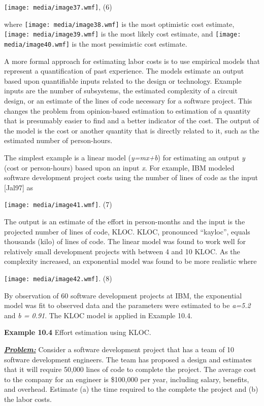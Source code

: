 \texttt{[image: media/image37.wmf]}, (6)

where \texttt{[image: media/image38.wmf]} is the most optimistic cost
estimate, \texttt{[image: media/image39.wmf]} is the most likely cost
estimate, and \texttt{[image: media/image40.wmf]} is the most
pessimistic cost estimate.

A more formal approach for estimating labor costs is to use empirical
models that represent a quantification of past experience. The models
estimate an output based upon quantifiable inputs related to the design
or technology. Example inputs are the number of subsystems, the
estimated complexity of a circuit design, or an estimate of the lines of
code necessary for a software project. This changes the problem from
opinion-based estimation to estimation of a quantity that is presumably
easier to find and a better indicator of the cost. The output of the
model is the cost or another quantity that is directly related to it,
such as the estimated number of person-hours.

The simplest example is a linear model (\emph{y=mx+b}) for estimating an
output \emph{y} (cost or person-hours) based upon an input \emph{x}. For
example, IBM modeled software development project costs using the number
of lines of code as the input {[}Jal97{]} as

\texttt{[image: media/image41.wmf]}. (7)

The output is an estimate of the effort in person-months and the input
is the projected number of lines of code, KLOC. KLOC, pronounced
``kayloc'', equals thousands (kilo) of lines of code. The linear model
was found to work well for relatively small development projects with
between 4 and 10 KLOC. As the complexity increased, an exponential model
was found to be more realistic where

\texttt{[image: media/image42.wmf]}. (8)

By observation of 60 software development projects at IBM, the
exponential model was fit to observed data and the parameters were
estimated to be \emph{a=5.2} and \emph{b = 0.91}. The KLOC model is
applied in Example 10.4.

\textbf{Example 10.4} Effort estimation using KLOC.

\emph{\textbf{\ul{Problem:}}} Consider a software development project
that has a team of 10 software development engineers. The team has
proposed a design and estimates that it will require 50,000 lines of
code to complete the project. The average cost to the company for an
engineer is \$100,000 per year, including salary, benefits, and
overhead. Estimate (a) the time required to the complete the project and
(b) the labor costs.

